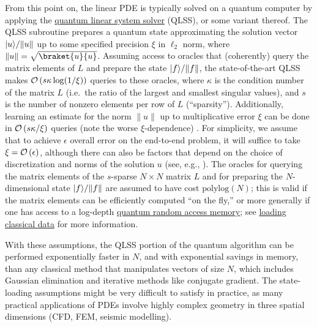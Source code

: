 \begin{refsection}
From this point on, the linear PDE is typically solved on a quantum computer by applying the \hyperref[prim:QuantumLinearSystemSolvers]{quantum linear system solver} (QLSS), or some variant thereof. The QLSS subroutine prepares a quantum state approximating the solution vector $\lvert u\rangle/\lVert u \rVert$ up to some specified precision $\xi$ in $\ell_2$ norm, where $\lVert u \rVert = \sqrt{\braket{u}{u}}$. Assuming access to oracles that (coherently) query the matrix elements of $L$ and prepare the state $\lvert f\rangle/\lVert f \rVert$, the state-of-the-art QLSS \cite{costa2021OptimalLinearSystem} makes $\mathcal{O}\left( s \kappa \log(1/\xi) \right)$ queries to these oracles, where $\kappa$ is the condition number of the matrix $L$ (i.e.~the ratio of the largest and smallest singular values), and $s$ is the number of nonzero elements per row of $L$ (``sparsity''). Additionally, learning an estimate for the norm $\lVert u \rVert$ up to multiplicative error $\xi$ can be done in $\mathcal{O}\left( s \kappa / \xi \right)$ queries (note the worse $\xi$-dependence) \cite{chakraborty2018BlockMatrixPowers}.  
For simplicity, we assume that to achieve $\epsilon$ overall error on the end-to-end problem, it will suffice to take $\xi = \mathcal{O}\left( \epsilon \right)$, although there can also be factors that depend on the choice of discretization and norms of the solution $u$ (see, e.g., \cite{montanaro2016quantum}). The oracles for querying the matrix elements of the $s$-sparse $N \times N$ matrix $L$ and for preparing the $N$-dimensional state $\lvert f\rangle/\lVert f \rVert$ are assumed to have cost $\mathrm{polylog}(N)$; this is valid if the matrix elements can be efficiently computed ``on the fly,'' or more generally if one has access to a log-depth \hyperref[prim:QRAM]{quantum random access memory};  see \hyperref[prim:LoadingClassicalData]{loading classical data} for more information. 

With these assumptions, the QLSS portion of the quantum algorithm can be performed exponentially faster in $N$, and with exponential savings in memory,  than any classical method that manipulates vectors of size $N$, which includes Gaussian elimination and iterative methods like conjugate gradient. The state-loading assumptions might be very difficult to satisfy in practice, as many practical applications of PDEs involve highly complex geometry in three spatial dimensions (CFD, FEM, seismic modelling).  


\end{refsection}

